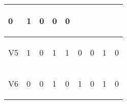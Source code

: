 \documentclass{article}
\begin{document}
\begin{center}
\begin{table}[!h]
\begin{tabular}{|p{}|p{}|p{}|p{}|p{}|p{}|p{}|p{}|p{}|}
\begin{center}
0
\end{center}
 & \begin{center}
1
\end{center}
 & \begin{center}
0
\end{center}
 & \begin{center}
0
\end{center}
 & \begin{center}
0
\end{center}
 \\
\hline 
 \begin{center}
V5
\end{center}
 & \begin{center}
1
\end{center}
 & \begin{center}
0
\end{center}
 & \begin{center}
1
\end{center}
 & \begin{center}
1
\end{center}
 & \begin{center}
0
\end{center}
 & \begin{center}
0
\end{center}
 & \begin{center}
1
\end{center}
 & \begin{center}
0
\end{center}
 \\
\hline 
 \begin{center}
V6
\end{center}
 & \begin{center}
0
\end{center}
 & \begin{center}
0
\end{center}
 & \begin{center}
1
\end{center}
 & \begin{center}
0
\end{center}
 & \begin{center}
1
\end{center}
 & \begin{center}
0
\end{center}
 & \begin{center}
1
\end{center}
 & \begin{center}
0
\end{center}

\end{tabular}
\end{table}
\end{center}
\end{document}
